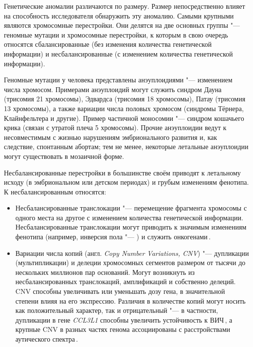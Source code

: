 \documentclass[a4paper,14pt]{extarticle}
\newcommand{\genename}[1]{\textit{#1}}
\newcommand{\ecitep}[1]{\textenglish{\citep{#1}}}
\newcommand{\engterm}[1]{англ. \textenglish{\textit{#1}}}
\begin{document}
Генетические аномалии различаются по размеру.
Размер непосредственно влияет на способность исследователя обнаружить эту аномалию.
Самыми крупными являются хромосомные перестройки.
Они делятся на две основных группы "--- геномные мутации и хромосомные перестройки, к которым в свою очередь относятся сбалансированные (без изменения количества генетической информации) и несбалансированные (с изменением количества генетической информации).

Геномные мутации у человека представлены анэуплоидиями "--- изменением числа хромосом.
Примерами анэуплоидий могут служить синдром Дауна (трисомия 21 хромосомы), Эдвардса (трисомия 18 хромосомы), Патау (трисомия 13 хромосомы), а также вариации числа половых хромосом (синдромы Тёрнера, Клайнфельтера и другие).
Пример частичной моносомии "--- синдром кошачьего крика (связан с утратой плеча 5 хромосомы).
Прочие анэуплоидии ведут к несовместимым с жизнью нарушениям эмбрионального развития и, как следствие, спонтанным абортам;
тем не менее, некоторые летальные анэуплоидии могут существовать в мозаичной форме.

Несбалансированные перестройки в большинстве своём приводят к летальному исходу (в эмбриональном или детском периодах) и грубым изменениям фенотипа.
К несбалансированным относятся:

\begin{itemize}
	\item Несбалансированные транслокации "--- перемещение фрагмента хромосомы с одного места на другое с изменением количества генетической информации.
	 Несбалансированные транслокации могут приводить к значимым изменениям фенотипа (например, инверсия пола "--- \citealp{Rizvi_2008}) и служить онкогенами\,\ecitep{O_Connor_2008}.
	\item Вариации числа копий (\engterm{Copy Number Variations, CNV}) "--- дупликации (мультипликации) и делеции хромосомных сегментов размером от тысячи до нескольких миллионов пар оснований.
	 Могут возникнуть из несбалансированных транслокаций, амплификаций и собственно делеций.
	 CNV способны увеличивать или уменьшать дозу гена, в значительной степени влияя на его экспрессию.
	 Различия в количестве копий могут носить как положительный характер, так и отрицательный "--- в частности, дупликации в гене \genename{CCL3L1} способны увеличить устойчивость к ВИЧ\,\ecitep{Gonzalez_2005}, а крупные CNV в разных частях генома ассоциированы с расстройствами аутического спектра\,\ecitep{Sebat_2007}.
\end{itemize}
\end{document}
